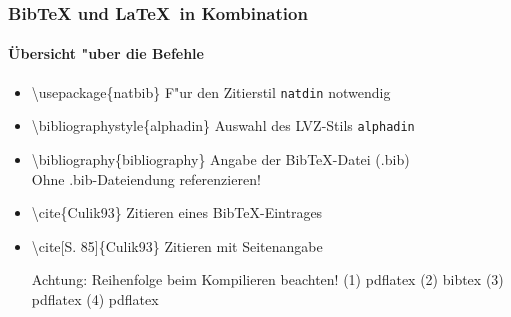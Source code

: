 \begin{frame}
\frametitle{BibTeX und \LaTeX ~in Kombination}
\framesubtitle{\"Ubersicht "uber die Befehle}
\begin{itemize}

\item \color{nounibaredI}\textbackslash usepackage\color{black}\{natbib\} \hfill F"ur den Zitierstil \texttt{natdin} notwendig\\

\item \color{nounibaredI}\textbackslash bibliographystyle\color{black}\{alphadin\} \hfill Auswahl des LVZ-Stils \glqq \texttt{alphadin}\grqq\\

\item \color{nounibaredI}\textbackslash bibliography\color{black}\{bibliography\} \hfill Angabe der  BibTeX-Datei (.bib)\\
\hfill Ohne .bib-Dateiendung referenzieren!




\item \color{nounibaredI}\textbackslash cite\color{black}\{Culik93\} \hfill Zitieren eines BibTeX-Eintrages\\

\item \color{nounibaredI}\textbackslash cite\color{black}[S. 85]\{Culik93\} \hfill Zitieren mit Seitenangabe\\

\bigskip

\begin{alertblock}{Achtung: Reihenfolge beim Kompilieren beachten!}
(1) pdflatex (2) bibtex (3) pdflatex (4) pdflatex
\end{alertblock}

\end{itemize}


\end{frame}

